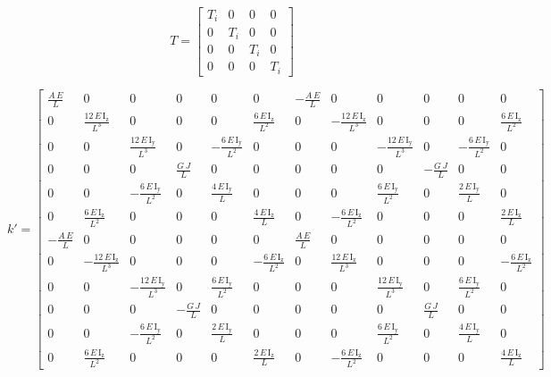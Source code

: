 \begin{equation}
    T = \left[ \begin{array}{cccc}
        T_{i} & 0 & 0 & 0 \\
        0 & T_{i} & 0 & 0 \\
        0 & 0 & T_{i} & 0 \\
        0 & 0 & 0 & T_{i}
    \end{array} \right]
\end{equation}

\begin{footnotesize}
\begin{equation}
    k' = \left[\begin{array}{cccccccccccc} \frac{A\, E}{L} & 0 & 0 & 0 & 0 & 0 & -\frac{A\, E}{L} & 0 & 0 & 0 & 0 & 0\\ 0 & \frac{12\, E\, \mathrm{I_z}}{L^3} & 0 & 0 & 0 & \frac{6\, E\, \mathrm{I_z}}{L^2} & 0 & -\frac{12\, E\, \mathrm{I_z}}{L^3} & 0 & 0 & 0 & \frac{6\, E\, \mathrm{I_z}}{L^2}\\ 0 & 0 & \frac{12\, E\, \mathrm{I_y}}{L^3} & 0 & -\frac{6\, E\, \mathrm{I_y}}{L^2} & 0 & 0 & 0 & -\frac{12\, E\, \mathrm{I_y}}{L^3} & 0 & -\frac{6\, E\, \mathrm{I_y}}{L^2} & 0\\ 0 & 0 & 0 & \frac{G\, J}{L} & 0 & 0 & 0 & 0 & 0 & -\frac{G\, J}{L} & 0 & 0\\ 0 & 0 & -\frac{6\, E\, \mathrm{I_y}}{L^2} & 0 & \frac{4\, E\, \mathrm{I_y}}{L} & 0 & 0 & 0 & \frac{6\, E\, \mathrm{I_y}}{L^2} & 0 & \frac{2\, E\, \mathrm{I_y}}{L} & 0\\ 0 & \frac{6\, E\, \mathrm{I_z}}{L^2} & 0 & 0 & 0 & \frac{4\, E\, \mathrm{I_z}}{L} & 0 & -\frac{6\, E\, \mathrm{I_z}}{L^2} & 0 & 0 & 0 & \frac{2\, E\, \mathrm{I_z}}{L}\\ -\frac{A\, E}{L} & 0 & 0 & 0 & 0 & 0 & \frac{A\, E}{L} & 0 & 0 & 0 & 0 & 0\\ 0 & -\frac{12\, E\, \mathrm{I_z}}{L^3} & 0 & 0 & 0 & -\frac{6\, E\, \mathrm{I_z}}{L^2} & 0 & \frac{12\, E\, \mathrm{I_z}}{L^3} & 0 & 0 & 0 & -\frac{6\, E\, \mathrm{I_z}}{L^2}\\ 0 & 0 & -\frac{12\, E\, \mathrm{I_y}}{L^3} & 0 & \frac{6\, E\, \mathrm{I_y}}{L^2} & 0 & 0 & 0 & \frac{12\, E\, \mathrm{I_y}}{L^3} & 0 & \frac{6\, E\, \mathrm{I_y}}{L^2} & 0\\ 0 & 0 & 0 & -\frac{G\, J}{L} & 0 & 0 & 0 & 0 & 0 & \frac{G\, J}{L} & 0 & 0\\ 0 & 0 & -\frac{6\, E\, \mathrm{I_y}}{L^2} & 0 & \frac{2\, E\, \mathrm{I_y}}{L} & 0 & 0 & 0 & \frac{6\, E\, \mathrm{I_y}}{L^2} & 0 & \frac{4\, E\, \mathrm{I_y}}{L} & 0\\ 0 & \frac{6\, E\, \mathrm{I_z}}{L^2} & 0 & 0 & 0 & \frac{2\, E\, \mathrm{I_z}}{L} & 0 & -\frac{6\, E\, \mathrm{I_z}}{L^2} & 0 & 0 & 0 & \frac{4\, E\, \mathrm{I_z}}{L} \end{array}\right]
\end{equation}
\end{footnotesize}

